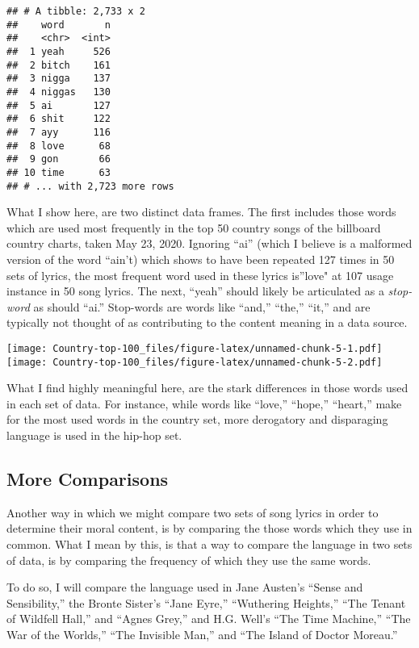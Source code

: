 \documentclass[]{article}
\begin{document}
\begin{verbatim}
## # A tibble: 2,733 x 2
##    word       n
##    <chr>  <int>
##  1 yeah     526
##  2 bitch    161
##  3 nigga    137
##  4 niggas   130
##  5 ai       127
##  6 shit     122
##  7 ayy      116
##  8 love      68
##  9 gon       66
## 10 time      63
## # ... with 2,723 more rows
\end{verbatim}

What I show here, are two distinct data frames. The first includes those
words which are used most frequently in the top 50 country songs of the
billboard country charts, taken May 23, 2020. Ignoring ``ai'' (which I
believe is a malformed version of the word ``ain't) which shows to have
been repeated 127 times in 50 sets of lyrics, the most frequent word
used in these lyrics is''love" at 107 usage instance in 50 song lyrics.
The next, ``yeah'' should likely be articulated as a \emph{stop-word} as
should ``ai.'' Stop-words are words like ``and,'' ``the,'' ``it,'' and
are typically not thought of as contributing to the content meaning in a
data source.

\texttt{[image: Country-top-100\_files/figure-latex/unnamed-chunk-5-1.pdf]}
\texttt{[image: Country-top-100\_files/figure-latex/unnamed-chunk-5-2.pdf]}

What I find highly meaningful here, are the stark differences in those
words used in each set of data. For instance, while words like ``love,''
``hope,'' ``heart,'' make for the most used words in the country set,
more derogatory and disparaging language is used in the hip-hop set.

\hypertarget{more-comparisons}{%
\subsection{More Comparisons}\label{more-comparisons}}

Another way in which we might compare two sets of song lyrics in order
to determine their moral content, is by comparing the those words which
they use in common. What I mean by this, is that a way to compare the
language in two sets of data, is by comparing the frequency of which
they use the same words.

To do so, I will compare the language used in Jane Austen's ``Sense and
Sensibility,'' the Bronte Sister's ``Jane Eyre,'' ``Wuthering Heights,''
``The Tenant of Wildfell Hall,'' and ``Agnes Grey,'' and H.G. Well's
``The Time Machine,'' ``The War of the Worlds,'' ``The Invisible Man,''
and ``The Island of Doctor Moreau.''
\end{document}
